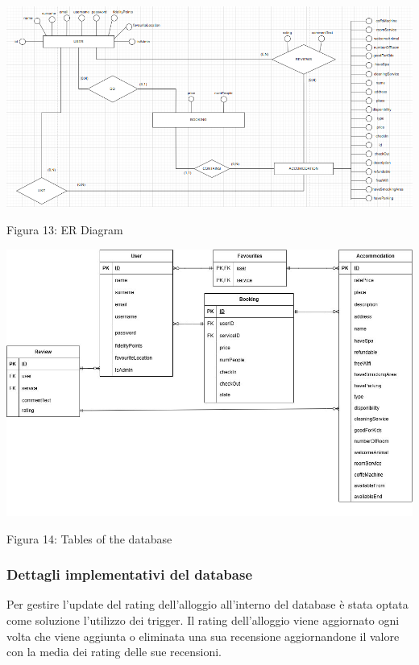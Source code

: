 \documentclass[10pt]{article}
\begin{document}
\begin{center}
\par\medskip
\hspace*{-2cm}
\includegraphics[scale=0.41]{ERImages/FinalER}
\par\medskip
Figura 13: ER Diagram
\par\medskip
\includegraphics[scale=0.5]{ERImages/schemaLogicoDBTabelle}
\par\medskip
Figura 14: Tables of the database
\par\medskip
\end{center}

\subsubsection{Dettagli implementativi del database}

Per gestire l'update del rating dell'alloggio all'interno del database è stata optata come soluzione l'utilizzo dei trigger. Il rating dell'alloggio viene aggiornato ogni volta che viene aggiunta o eliminata una sua recensione aggiornandone il valore con la media dei rating delle sue recensioni.
\end{document}
